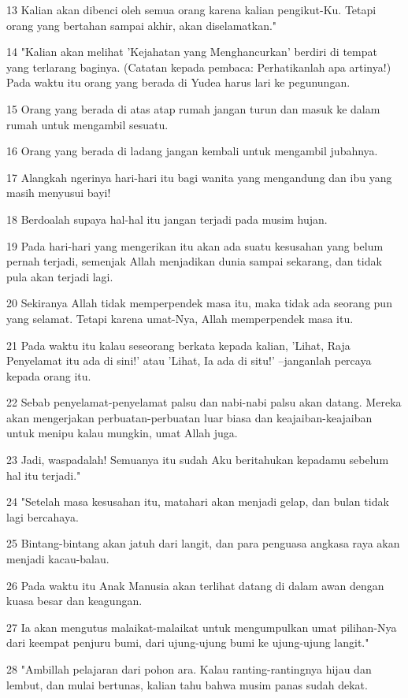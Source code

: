 \par 13 Kalian akan dibenci oleh semua orang karena kalian pengikut-Ku. Tetapi orang yang bertahan sampai akhir, akan diselamatkan."
\par 14 "Kalian akan melihat 'Kejahatan yang Menghancurkan' berdiri di tempat yang terlarang baginya. (Catatan kepada pembaca: Perhatikanlah apa artinya!) Pada waktu itu orang yang berada di Yudea harus lari ke pegunungan.
\par 15 Orang yang berada di atas atap rumah jangan turun dan masuk ke dalam rumah untuk mengambil sesuatu.
\par 16 Orang yang berada di ladang jangan kembali untuk mengambil jubahnya.
\par 17 Alangkah ngerinya hari-hari itu bagi wanita yang mengandung dan ibu yang masih menyusui bayi!
\par 18 Berdoalah supaya hal-hal itu jangan terjadi pada musim hujan.
\par 19 Pada hari-hari yang mengerikan itu akan ada suatu kesusahan yang belum pernah terjadi, semenjak Allah menjadikan dunia sampai sekarang, dan tidak pula akan terjadi lagi.
\par 20 Sekiranya Allah tidak memperpendek masa itu, maka tidak ada seorang pun yang selamat. Tetapi karena umat-Nya, Allah memperpendek masa itu.
\par 21 Pada waktu itu kalau seseorang berkata kepada kalian, 'Lihat, Raja Penyelamat itu ada di sini!' atau 'Lihat, Ia ada di situ!' --janganlah percaya kepada orang itu.
\par 22 Sebab penyelamat-penyelamat palsu dan nabi-nabi palsu akan datang. Mereka akan mengerjakan perbuatan-perbuatan luar biasa dan keajaiban-keajaiban untuk menipu kalau mungkin, umat Allah juga.
\par 23 Jadi, waspadalah! Semuanya itu sudah Aku beritahukan kepadamu sebelum hal itu terjadi."
\par 24 "Setelah masa kesusahan itu, matahari akan menjadi gelap, dan bulan tidak lagi bercahaya.
\par 25 Bintang-bintang akan jatuh dari langit, dan para penguasa angkasa raya akan menjadi kacau-balau.
\par 26 Pada waktu itu Anak Manusia akan terlihat datang di dalam awan dengan kuasa besar dan keagungan.
\par 27 Ia akan mengutus malaikat-malaikat untuk mengumpulkan umat pilihan-Nya dari keempat penjuru bumi, dari ujung-ujung bumi ke ujung-ujung langit."
\par 28 "Ambillah pelajaran dari pohon ara. Kalau ranting-rantingnya hijau dan lembut, dan mulai bertunas, kalian tahu bahwa musim panas sudah dekat.
